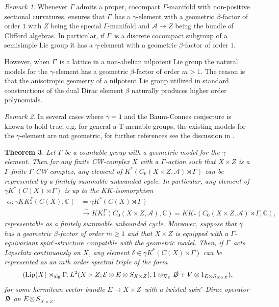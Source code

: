 \documentclass[a4paper,reqno]{amsart}
\numberwithin{equation}{section}
\def\C{\mathbb{C}}
\newtheorem{thm*}{Theorem}
\theoremstyle{definition}
\theoremstyle{remark}
\newtheorem{remark*}[thm*]{Remark}
\begin{document}
\begin{remark*}
Whenever $\Gamma$ admits a proper, cocompact $\Gamma$-manifold with non-positive sectional curvatures, \cite{kaspinv} ensures that $\Gamma$ has a $\gamma$-element with a geometric $\beta$-factor of order $1$ with $Z$ being the special $\Gamma$-manifold and $\mathcal{A}\to Z$ being the bundle of Clifford algebras. In particular, if $\Gamma$ is a discrete cocompact subgroup of a semisimple Lie group it has a $\gamma$-element with a geometric $\beta$-factor of order $1$. 

However, when $\Gamma$ is a lattice in a non-abelian nilpotent Lie group the natural models for the $\gamma$-element has a geometric $\beta$-factor of order $m> 1$. The reason is that the anisotropic geometry of a nilpotent Lie group utilized in standard constructions of the dual Dirac element $\beta$ naturally produces higher order polynomials.
\end{remark*}

\begin{remark*}
In several cases where $\gamma=1$ and the Baum-Connes conjecture is known to hold true, e.g. for general a-T-menable groups, the existing models for the $\gamma$-element are not geometric, for further references see the discussion in \cite[Introduction]{laffinv}.
\end{remark*}


\begin{thm*}
\label{mainthm1}
Let $\Gamma$ be a countable group with a geometric model for the $\gamma$-element. Then for any finite CW-complex $X$ with a $\Gamma$-action such that $X\times Z$ is a $\Gamma$-finite $\Gamma$-CW-complex, any element of $K^*(C_0(X\times Z,\mathcal{A})\rtimes \Gamma)$ can be represented by a finitely summable unbounded cycle. In particular, any element of $\gamma K^*(C(X)\rtimes \Gamma)$ is up to the $KK$-isomorphism 
\begin{align*}
\alpha:\gamma KK_*^\Gamma(C(X),\C)&=\gamma K^*(C(X)\rtimes \Gamma)\\
&\xrightarrow{\sim} KK_*^\Gamma(C_0(X\times Z, \mathcal{A}),\C)=KK_*(C_0(X\times Z, \mathcal{A})\rtimes \Gamma,\C),
\end{align*}
representable as a finitely summable unbounded cycle. Moreover, suppose that $\gamma$ has a geometric $\beta$-factor of order $m\geq 1$ and that $X\times Z$ is equipped with a $\Gamma$-equivariant spin$^c$-structure compatible with the geometric model. Then, if $\Gamma$ acts Lipschitz continuously on $X$, any element $\delta\in \gamma K^*(C(X)\rtimes \Gamma)$ can be represented as an $m$th order spectral triple of the form
$$(\mathrm{Lip}(X)\rtimes_{\rm alg}\Gamma,L^2(X\times Z;\mathcal{E}\otimes E\otimes S_{X\times Z} ),1\otimes_{\nabla_\mathcal{E}}\slashed{D}+V\otimes 1_{E\otimes S_{X\times Z}}),$$
for some hermitean vector bundle $E\to X\times Z$ with a twisted spin$^c$-Dirac operator $\slashed{D}$ on $E\otimes S_{X\times Z}$.
\end{thm*}
\end{document}
